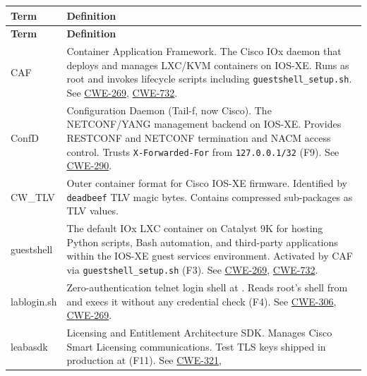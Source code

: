 \documentclass[11pt,a4paper]{article}
\begin{document}
\begin{longtable}{@{}lL{11cm}@{}}
  \toprule
  \textbf{Term} & \textbf{Definition} \\
  \midrule \endfirsthead
  \toprule
  \textbf{Term} & \textbf{Definition} \\
  \midrule \endhead
  \bottomrule \endlastfoot
  CAF        & Container Application Framework. The Cisco IOx daemon that deploys and
               manages LXC/KVM containers on IOS-XE. Runs as root and invokes
               lifecycle scripts including \texttt{guestshell\_setup.sh}.
               See \href{https://cwe.mitre.org/data/definitions/269.html}{CWE-269},
               \href{https://cwe.mitre.org/data/definitions/732.html}{CWE-732}. \\[0.3em]
  ConfD      & Configuration Daemon (Tail-f, now Cisco). The NETCONF/YANG management
               backend on IOS-XE. Provides RESTCONF and NETCONF termination and
               NACM access control. Trusts \texttt{X-Forwarded-For} from
               \texttt{127.0.0.1/32} (F9).
               See \href{https://cwe.mitre.org/data/definitions/290.html}{CWE-290}. \\[0.3em]
  CW\_TLV    & Outer container format for Cisco IOS-XE firmware. Identified by
               \texttt{deadbeef} TLV magic bytes. Contains compressed sub-packages
               as TLV values. \\[0.3em]
  guestshell & The default IOx LXC container on Catalyst 9K for hosting Python
               scripts, Bash automation, and third-party applications within the
               IOS-XE guest services environment. Activated by CAF via
               \texttt{guestshell\_setup.sh} (F3).
               See \href{https://cwe.mitre.org/data/definitions/269.html}{CWE-269},
               \href{https://cwe.mitre.org/data/definitions/732.html}{CWE-732}. \\[0.3em]
  lablogin.sh & Zero-authentication telnet login shell at .
               Reads root's shell from  and execs it without
               any credential check (F4).
               See \href{https://cwe.mitre.org/data/definitions/306.html}{CWE-306},
               \href{https://cwe.mitre.org/data/definitions/269.html}{CWE-269}. \\[0.3em]
  leabasdk   & Licensing and Entitlement Architecture SDK. Manages Cisco Smart
               Licensing communications. Test TLS keys shipped in production at
                (F11).
               See \href{https://cwe.mitre.org/data/definitions/321.html}{CWE-321},

\end{longtable}
\end{document}
